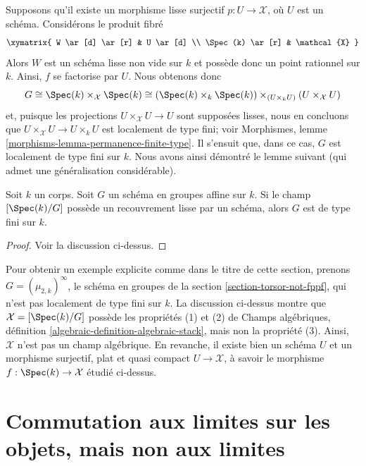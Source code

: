 \medskip\noindent
Supposons qu'il existe un morphisme lisse surjectif
$p : U \to \mathcal{X}$, où $U$ est un schéma.
Considérons le produit fibré
$$
\xymatrix{
W \ar[d] \ar[r] & U \ar[d] \\
\Spec(k) \ar[r] & \mathcal{X}
}
$$
Alors $W$ est un schéma lisse non vide sur $k$ et possède donc
un point rationnel sur $k$. Ainsi, $f$ se factorise par $U$.
Nous obtenons donc
$$
G \cong
\Spec(k) \times_\mathcal{X} \Spec(k) \cong
(\Spec(k) \times_k \Spec(k))
\times_{(U \times_k U)}
(U \times_\mathcal{X} U)
$$
et, puisque les projections $U \times_\mathcal{X} U \to U$ sont
supposées lisses, nous en concluons que
$U \times_\mathcal{X} U \to U \times_k U$ est
localement de type fini; voir
Morphismes, lemme \ref{morphisms-lemma-permanence-finite-type}.
Il s'ensuit que, dans ce cas, $G$ est localement de type fini sur $k$.
Nous avons ainsi démontré le lemme suivant (qui admet une
généralisation considérable).

\begin{lemma}
\label{lemma-BG-algebraic}
Soit $k$ un corps. Soit $G$ un schéma en groupes affine sur $k$.
Si le champ $[\Spec(k)/G]$ possède un recouvrement lisse par un
schéma, alors $G$ est de type fini sur $k$.
\end{lemma}

\begin{proof}
Voir la discussion ci-dessus.
\end{proof}

\noindent
Pour obtenir un exemple explicite comme dans le titre de cette section, prenons
$G = (\mu_{2, k})^\infty$, le schéma en groupes de la
section \ref{section-torsor-not-fppf}, qui n'est pas localement de type fini
sur $k$. La discussion ci-dessus montre que
$\mathcal{X} = [\Spec(k)/G]$ possède les propriétés (1) et (2) de
Champs algébriques, définition \ref{algebraic-definition-algebraic-stack},
mais non la propriété (3). Ainsi, $\mathcal{X}$ n'est pas un champ algébrique.
En revanche, il existe bien un schéma $U$ et un morphisme surjectif,
plat et quasi compact $U \to \mathcal{X}$, à savoir le morphisme
$f : \Spec(k) \to \mathcal{X}$ étudié ci-dessus.






\section{Commutation aux limites sur les objets, mais non aux limites}
\label{section-limit-preserving}

